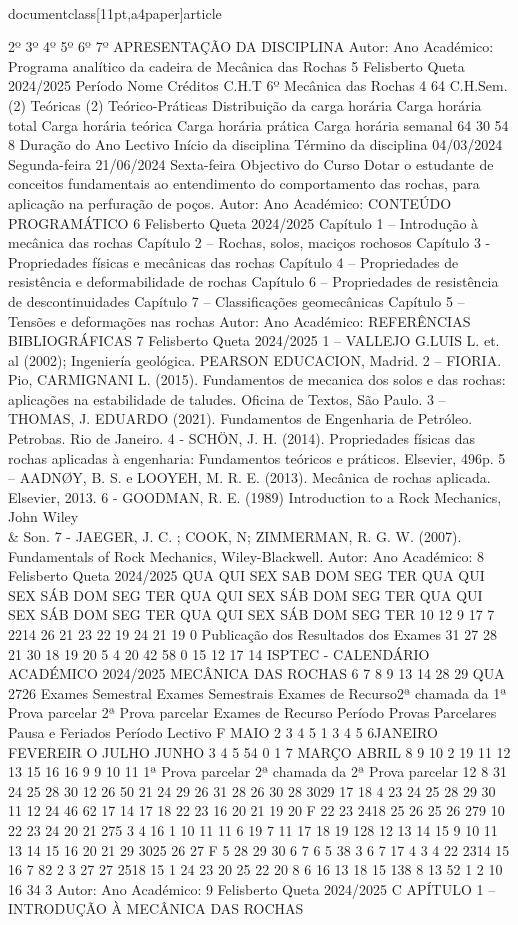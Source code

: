 \\documentclass[11pt,a4paper]{article}
\begin{document}
2º
3º
4º
5º
6º
7º
APRESENTAÇÃO DA DISCIPLINA
Autor:
Ano Académico:
Programa analítico da cadeira de Mecânica das Rochas 5
Felisberto Queta
2024/2025
Período Nome Créditos C.H.T 
6º Mecânica das Rochas 4 64
C.H.Sem. (2) Teóricas (2) Teórico-Práticas 
Distribuição da carga horária
Carga horária total Carga horária teórica Carga horária prática Carga horária 
semanal 
64 30 54 8
Duração do Ano Lectivo
Início da disciplina Término da disciplina
04/03/2024 Segunda-feira 21/06/2024 Sexta-feira
Objectivo do Curso
Dotar o estudante de conceitos fundamentais ao entendimento do comportamento das
rochas, para aplicação na perfuração de poços.
Autor:
Ano Académico:
CONTEÚDO PROGRAMÁTICO 6
Felisberto Queta
2024/2025
Capítulo 1 – Introdução à mecânica das rochas 
Capítulo 2 – Rochas, solos, maciços rochosos
Capítulo 3 - Propriedades físicas e mecânicas das rochas 
Capítulo 4 – Propriedades de resistência e deformabilidade de rochas
Capítulo 6 – Propriedades de resistência de descontinuidades
Capítulo 7 – Classificações geomecânicas
Capítulo 5 – Tensões e deformações nas rochas
Autor:
Ano Académico:
REFERÊNCIAS BIBLIOGRÁFICAS 7
Felisberto Queta
2024/2025
1 – VALLEJO G.LUIS L. et. al (2002); Ingeniería geológica. PEARSON EDUCACION, Madrid.
2 – FIORIA. Pio, CARMIGNANI L. (2015). Fundamentos de mecanica dos solos e das rochas: 
aplicações na estabilidade de taludes. Oficina de Textos, São Paulo.
3 – THOMAS, J. EDUARDO (2021). Fundamentos de Engenharia de Petróleo. Petrobas. Rio de 
Janeiro.
4 - SCHÖN, J. H. (2014). Propriedades físicas das rochas aplicadas à engenharia: Fundamentos 
teóricos e práticos. Elsevier, 496p.
5 – AADNØY, B. S. e LOOYEH, M. R. E. (2013). Mecânica de rochas aplicada. Elsevier, 2013.
6 - GOODMAN, R. E. (1989) Introduction to a Rock Mechanics, John Wiley \\& Son.
7 - JAEGER, J. C. ; COOK, N; ZIMMERMAN, R. G. W. (2007). Fundamentals of Rock Mechanics, 
Wiley-Blackwell.
Autor:
Ano Académico:
8
Felisberto Queta
2024/2025
QUA QUI SEX SAB DOM SEG TER QUA QUI SEX SÁB DOM SEG TER QUA QUI SEX SÁB DOM SEG TER QUA QUI SEX SÁB DOM SEG TER QUA QUI SEX SÁB DOM SEG TER
10
12
9 17
7 2214
26
21
23
22
19
24
21
19
0
Publicação dos Resultados dos 
Exames
31
27 28
21
30
18 19 20
5
4
20
42
58
0
15
12
17
14
ISPTEC - CALENDÁRIO  ACADÉMICO 2024/2025  MECÂNICA DAS ROCHAS
6 7 8 9 13 14
28 29
QUA
2726
Exames Semestral
Exames Semestrais Exames de Recurso2ª chamada da 1ª Prova parcelar 
2ª Prova parcelar Exames de Recurso
Período Provas Parcelares
Pausa e Feriados
Período Lectivo
F
MAIO
2 3 4 5
1
3 4 5 6JANEIRO
FEVEREIR
O
JULHO
JUNHO
3
4 5
54
0
1
7
MARÇO
ABRIL
8 9 10
2
19
11 12 13
15 16
16
9
9 10 11
1ª Prova parcelar 2ª chamada da 2ª Prova parcelar 
12
8
31
24 25
28 30
12
26
50
21
24 29
26
31
28
26
30
28 3029
17 18
4
23 24 25 28 29 30
11 12
24
46
62
17
14 17 18 22 23
16 20 21
19 20 F 22 23 2418 25 26
25 26 279 10 22 23 24
20 21
275
3 4
16
1 10 11
11
6
19
7
11 17 18 19
128
12 13 14 15
9 10 11 13 14 15 16
20 21
29 3025 26 27
F 5
28 29 30
6 7
6
5
38
3
6 7 17
4
3
4 22 2314 15 16
7 82
2 3
27
27
2518
15
1 24
23
20
25
22
20
8
6
16
13
18
15
138
8
13
52
1 2
10 16
34
3
Autor:
Ano Académico:
9
Felisberto Queta
2024/2025
C
APÍTULO 1 
–
INTRODUÇÃO À MECÂNICA 
DAS ROCHAS\
\end{document}
